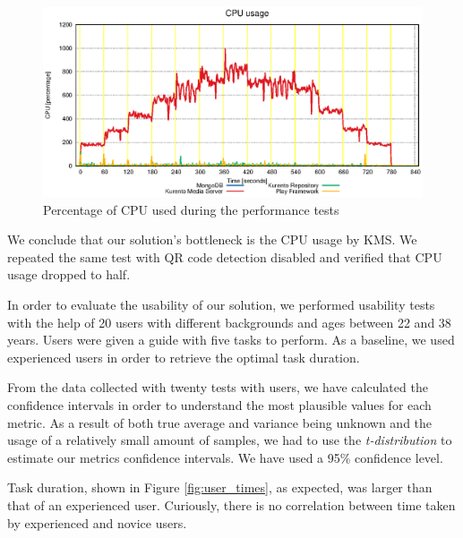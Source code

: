\documentclass[10pt,conference]{IEEEtran}
\begin{document}
\begin{figure}
  \centering
  \includegraphics[width=\linewidth]{stats/test_full_features_cpu.eps}
  \caption{Percentage of CPU used during the performance tests}
  \label{fig:test_full_features_cpu}
\end{figure}

We conclude that our solution's bottleneck is the \gls{CPU} usage by \gls{KMS}.
We repeated the same test with \gls{QR} code detection disabled and verified that \gls{CPU} usage dropped to half.




In order to evaluate the usability of our solution, we performed usability tests with the help of 20 users with different backgrounds and ages between 22 and 38 years. 
Users were given a guide with five tasks to perform.
As a baseline, we used experienced users in order to retrieve the optimal task duration.


From the data collected with twenty tests with users, we have calculated the confidence intervals in order to understand the most plausible values for each metric.
As a result of both true average and variance being unknown and the usage of a relatively small amount of samples, we had to use the \emph{t-distribution} to estimate our metrics confidence intervals.
We have used a 95\% confidence level.

Task duration, shown in Figure \ref{fig:user_times}, as expected, was larger than that of an experienced user.
Curiously, there is no correlation between time taken by experienced and novice users.
\end{document}
